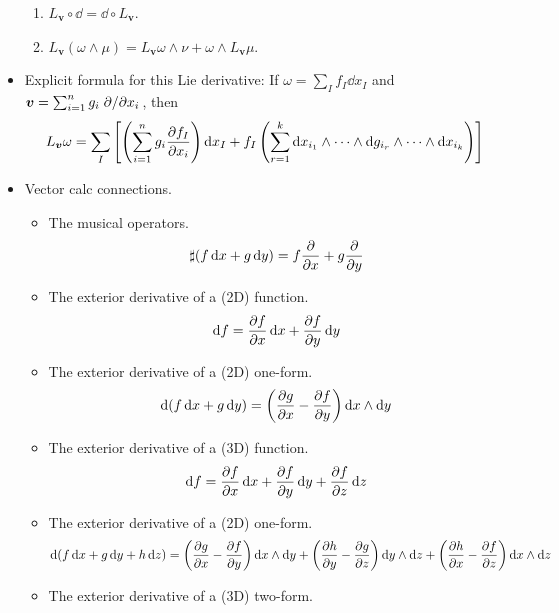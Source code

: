 \documentclass[../notes.tex]{subfiles}
\begin{document}
\begin{itemize}
\begin{enumerate}
        \item $L_{\bm{v}}\circ\dd=\dd\circ L_{\bm{v}}$.
        \item $L_{\bm{v}}(\omega\wedge\mu)=L_{\bm{v}}\omega\wedge\nu+\omega\wedge L_{\bm{v}}\mu$.
    \end{enumerate}
    \item Explicit formula for this Lie derivative: If $\omega=\sum_If_I\dd{x_I}$ and $\bm{v}=\sum_{i=1}^ng_i\pdv*{x_i}$, then
    \begin{equation*}
        L_{\bm{v}}\omega = \sum_I\left[ \left( \sum_{i=1}^ng_i\pdv{f_I}{x_i} \right)\dd{x_I}+f_I\left( \sum_{r=1}^k\dd{x_{i_1}}\wedge\cdots\wedge\dd{g_{i_r}}\wedge\cdots\wedge\dd{x_{i_k}} \right) \right]
    \end{equation*}
    \item Vector calc connections.
    \begin{itemize}
        \item The musical operators.
        \begin{equation*}
            \sharp(f\dd{x}+g\dd{y}) = f\pdv{x}+g\pdv{y}
        \end{equation*}
        \item The exterior derivative of a (2D) function.
        \begin{equation*}
            \dd f = \pdv{f}{x}\dd{x}+\pdv{f}{y}\dd{y}
        \end{equation*}
        \item The exterior derivative of a (2D) one-form.
        \begin{equation*}
            \dd(f\dd{x}+g\dd{y}) = \left( \pdv{g}{x}-\pdv{f}{y} \right)\dd{x}\wedge\dd{y}
        \end{equation*}
        \item The exterior derivative of a (3D) function.
        \begin{equation*}
            \dd f = \pdv{f}{x}\dd{x}+\pdv{f}{y}\dd{y}+\pdv{f}{z}\dd{z}
        \end{equation*}
        \item The exterior derivative of a (2D) one-form.
        \begin{equation*}
            \dd(f\dd{x}+g\dd{y}+h\dd{z}) = \left( \pdv{g}{x}-\pdv{f}{y} \right)\dd{x}\wedge\dd{y}+\left( \pdv{h}{y}-\pdv{g}{z} \right)\dd{y}\wedge\dd{z}+\left( \pdv{h}{x}-\pdv{f}{z} \right)\dd{x}\wedge\dd{z}
        \end{equation*}
        \item The exterior derivative of a (3D) two-form.

\end{itemize}
\end{itemize}
\end{document}
